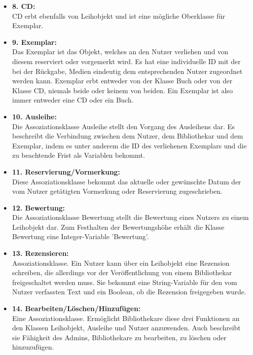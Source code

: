 \documentclass[fontsize=12pt,paper=a4,twoside]{scrartcl}
\begin{document}
\begin{itemize}
\item \textbf{8. CD:}\\
CD erbt ebenfalls von Leihobjekt und ist eine mögliche Oberklasse für Exemplar.

\item \textbf{9. Exemplar:}\\
Das Exemplar ist das Objekt, welches an den Nutzer verliehen und von diesem reserviert oder vorgemerkt wird. Es hat eine individuelle ID mit der bei der Rückgabe, Medien
eindeutig dem entsprechenden Nutzer zugeordnet werden kann. Exemplar erbt entweder von
der Klasse Buch oder von der Klasse CD, niemals beide oder keinem von beiden. Ein Exemplar ist also immer entweder eine CD oder ein Buch.

\item \textbf{10. Ausleihe:}\\
Die Assoziationsklasse Ausleihe stellt den Vorgang des Ausleihens dar.
Es beschreibt die Verbindung zwischen dem Nutzer, dem Bibliothekar und dem Exemplar, indem es unter anderem die ID des verliehenen Exemplars und die zu beachtende Frist 
als Variablen bekommt. 


\item \textbf{11. Reservierung/Vormerkung:}\\
Diese Assoziationsklasse bekommt das aktuelle oder gewünschte Datum der vom Nutzer getätigten Vormerkung oder Reservierung zugeschrieben.

\item \textbf{12. Bewertung:}\\
Die Assoziationsklasse Bewertung stellt die Bewertung eines Nutzers zu einem Leihobjekt dar. Zum Festhalten der Bewertungshöhe erhält die Klasse Bewertung
eine Integer-Variable 'Bewertung'.

\item \textbf{13. Rezensieren:}\\
Assoziationsklasse. Ein Nutzer kann über ein Leihobjekt eine Rezension schreiben, die allerdings vor der Veröffentlichung von einem Bibliothekar freigeschaltet werden muss. Sie bekommt eine String-Variable für den vom Nutzer verfassten Text und ein Boolean, ob die Rezension freigegeben wurde.

\item \textbf{14. Bearbeiten/Löschen/Hinzufügen:}\\
Eine Assoziationsklasse. Ermöglicht Bibliothekare diese drei Funktionen an den Klassen 
Leihobjekt, Ausleihe und Nutzer anzuwenden. Auch beschreibt sie Fähigkeit des Admins,
Bibliothekare zu bearbeiten, zu löschen oder hinzuzufügen.
\end{itemize}
 
\end{document}
